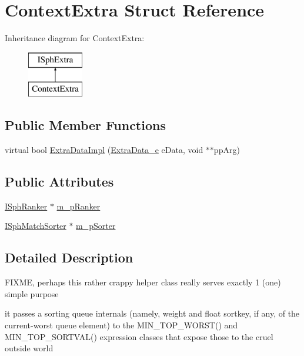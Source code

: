 \hypertarget{structContextExtra}{\section{Context\-Extra Struct Reference}
\label{structContextExtra}
}
Inheritance diagram for Context\-Extra\-:\begin{figure}[H]
\begin{center}
\leavevmode
\includegraphics[height=2.000000cm]{structContextExtra}
\end{center}
\end{figure}
\subsection*{Public Member Functions}
\begin{DoxyCompactItemize}
\item 
virtual bool \hyperlink{structContextExtra_a43da928bb0a840a566efa77942800847}{Extra\-Data\-Impl} (\hyperlink{sphinxint_8h_ad3985aadf484a2191d9758968e2dfa88}{Extra\-Data\-\_\-e} e\-Data, void $\ast$$\ast$pp\-Arg)
\end{DoxyCompactItemize}
\subsection*{Public Attributes}
\begin{DoxyCompactItemize}
\item 
\hyperlink{classISphRanker}{I\-Sph\-Ranker} $\ast$ \hyperlink{structContextExtra_aef5b7622ed20e52f148846873e9d69b9}{m\-\_\-p\-Ranker}
\item 
\hyperlink{classISphMatchSorter}{I\-Sph\-Match\-Sorter} $\ast$ \hyperlink{structContextExtra_a285024a92158bbeb503f1cb870558226}{m\-\_\-p\-Sorter}
\end{DoxyCompactItemize}


\subsection{Detailed Description}
F\-I\-X\-M\-E, perhaps this rather crappy helper class really serves exactly 1 (one) simple purpose

it passes a sorting queue internals (namely, weight and float sortkey, if any, of the current-\/worst queue element) to the M\-I\-N\-\_\-\-T\-O\-P\-\_\-\-W\-O\-R\-S\-T() and M\-I\-N\-\_\-\-T\-O\-P\-\_\-\-S\-O\-R\-T\-V\-A\-L() expression classes that expose those to the cruel outside world

